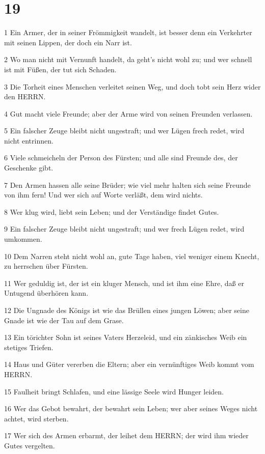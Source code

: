 \chapter{19}

\par 1 Ein Armer, der in seiner Frömmigkeit wandelt, ist besser denn ein Verkehrter mit seinen Lippen, der doch ein Narr ist.
\par 2 Wo man nicht mit Vernunft handelt, da geht's nicht wohl zu; und wer schnell ist mit Füßen, der tut sich Schaden.
\par 3 Die Torheit eines Menschen verleitet seinen Weg, und doch tobt sein Herz wider den HERRN.
\par 4 Gut macht viele Freunde; aber der Arme wird von seinen Freunden verlassen.
\par 5 Ein falscher Zeuge bleibt nicht ungestraft; und wer Lügen frech redet, wird nicht entrinnen.
\par 6 Viele schmeicheln der Person des Fürsten; und alle sind Freunde des, der Geschenke gibt.
\par 7 Den Armen hassen alle seine Brüder; wie viel mehr halten sich seine Freunde von ihm fern! Und wer sich auf Worte verläßt, dem wird nichts.
\par 8 Wer klug wird, liebt sein Leben; und der Verständige findet Gutes.
\par 9 Ein falscher Zeuge bleibt nicht ungestraft; und wer frech Lügen redet, wird umkommen.
\par 10 Dem Narren steht nicht wohl an, gute Tage haben, viel weniger einem Knecht, zu herrschen über Fürsten.
\par 11 Wer geduldig ist, der ist ein kluger Mensch, und ist ihm eine Ehre, daß er Untugend überhören kann.
\par 12 Die Ungnade des Königs ist wie das Brüllen eines jungen Löwen; aber seine Gnade ist wie der Tau auf dem Grase.
\par 13 Ein törichter Sohn ist seines Vaters Herzeleid, und ein zänkisches Weib ein stetiges Triefen.
\par 14 Haus und Güter vererben die Eltern; aber ein vernünftiges Weib kommt vom HERRN.
\par 15 Faulheit bringt Schlafen, und eine lässige Seele wird Hunger leiden.
\par 16 Wer das Gebot bewahrt, der bewahrt sein Leben; wer aber seines Weges nicht achtet, wird sterben.
\par 17 Wer sich des Armen erbarmt, der leihet dem HERRN; der wird ihm wieder Gutes vergelten.

